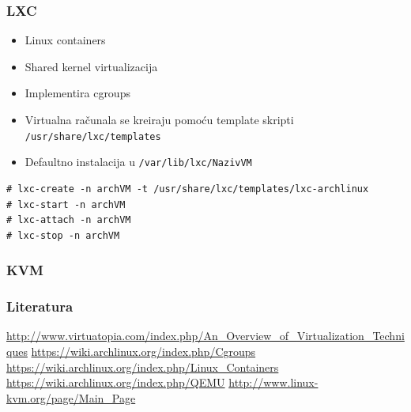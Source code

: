 \documentclass[t]{beamer}
\begin{document}
\begin{frame}[fragile]
	\frametitle{LXC}

	\begin{itemize}
		\item Linux containers
		
		\item Shared kernel virtualizacija
		\item Implementira cgroups
	\end{itemize}

	\begin{itemize}
		\item Virtualna računala se kreiraju pomoću template skripti \texttt{/usr/share/lxc/templates}
		\item Defaultno instalacija u \texttt{/var/lib/lxc/NazivVM}
	\end{itemize}
	
	\scriptsize
	\begin{verbatim}
# lxc-create -n archVM -t /usr/share/lxc/templates/lxc-archlinux
# lxc-start -n archVM
# lxc-attach -n archVM
# lxc-stop -n archVM
	\end{verbatim}

\end{frame}


\begin{frame}
	\frametitle{KVM}
\end{frame}


\begin{frame}
	\frametitle{Literatura}
	\url{http://www.virtuatopia.com/index.php/An_Overview_of_Virtualization_Techniques}
	\vfill
	\url{https://wiki.archlinux.org/index.php/Cgroups}
	\url{https://wiki.archlinux.org/index.php/Linux_Containers}
	\url{https://wiki.archlinux.org/index.php/QEMU}
	\url{http://www.linux-kvm.org/page/Main_Page}
\end{frame}
\end{document}
